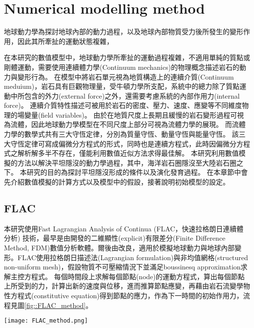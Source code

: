 
\chapter{Numerical modelling method}


地球動力學為探討地球內部的動力過程，以及地球內部物質受力後所發生的變形作用，因此其所牽扯的運動狀態複雜，

在本研究的數值模型中，地球動力學所牽扯的運動過程複雜，不適用單純的質點或剛體運動，需要使用連續體力學(Continuum mechanics)的物理概念描述岩石的動力與變形行為。
在模型中將岩石單元視為地質構造上的連續介質(Continuum meduium)，岩石具有巨觀物理量，受牛頓力學所支配，系統中的總力除了質點運動中所包含的外力(external force)之外，還需要考慮系統的內部作用力(internal force)。
連續介質特性描述可被用於岩石的密度、壓力、速度、應變等不同維度物理的場變量(field variables)。
由於在地質尺度上長期且緩慢的岩石變形過程可視為流體，因此地球動力學模型在不同尺度上部分可視為流體力學的展現。
而流體力學的數學式共有三大守恆定律，分別為質量守恆、動量守恆與能量守恆。
該三大守恆定律可寫成偏微分方程式的形式，同時也是連續方程式，此時因偏微分方程式之解析解多半不存在，僅能利用數值近似方法求得最佳解。
本研究利用數值模擬的方法以解決平坦隱沒的動力學過程，其中，海洋岩石圈隱沒至大陸岩石圈之下。
本研究的目的為探討平坦隱沒形成的條件以及演化發育過程。
在本章節中會先介紹數值模擬的計算方式以及模型中的假設，接著說明初始模型的設定。

\section{FLAC}

本研究使用Fast Lagrangian Analysis of Continua (FLAC，快速拉格朗日連續體分析) 技術，最早是由\citealp{cundall1989numerical}開發的二維顯性(explicit)有限差分(Finite Difference Method, FDM)數值分析軟體。爾後由\citealp{Lavier2000}改良，適用於模擬地球動力與地球內部變形。FLAC使用拉格朗日描述法(Lagrangian formulation)與非均值網格(structured non-uniform mesh)，假設物質不可壓縮情況下並滿足boussinesq approximation求解主控方程式。
每個時間段上求解每個節點(node)的運動方程式，算出每個節點上所受到的力，計算出新的速度與位移，進而推算節點應變，再藉由岩石流變學物性方程式(constitutive equation)得到節點的應力，作為下一時間的初始作用力，流程見圖\ref{fig::FLAC_method}。

\begin{figure*}[ht!]
    \centering
    \texttt{[image: FLAC\_method.png]}
    \caption{FLAC 程式運算流程圖
    }
    \label{fig::FLAC_method}
\end{figure*}

